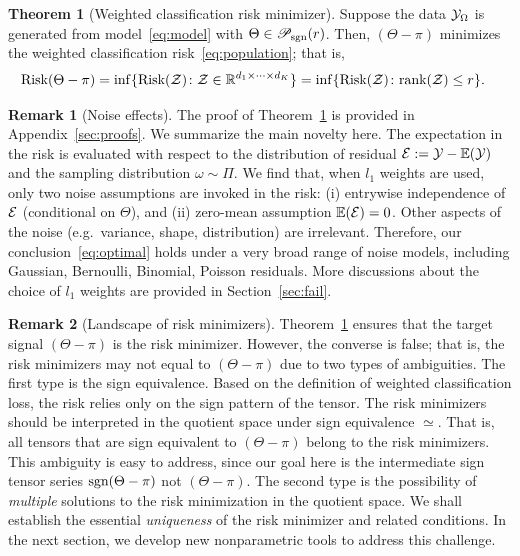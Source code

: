 \documentclass[twoside,11pt]{article}
\theoremstyle{definition}
\newtheorem{thm}{Theorem}
\newtheorem{rmk}{Remark}
\def\sign{\textup{sgn}}
\def\caliP{\mathscr{P}_{\textup{sgn}}}
\begin{document}
\begin{thm}[Weighted classification risk minimizer]\label{prop:global}
Suppose the data $\mathcal{Y}_\Omega$ is generated from model~\eqref{eq:model} with $\Theta \in \caliP(r)$. Then, $(\Theta-\pi)$ minimizes the weighted classification risk~\eqref{eq:population}; that is,
\begin{align}\label{eq:optimal}
\textup{Risk}(\Theta -\pi)&=\inf\{\textup{Risk}(\mathcal{Z})\colon \mathcal{Z}\in\mathbb{R}^{d_1\times \cdots \times d_K}\}
=\inf\{\textup{Risk}(\mathcal{Z})\colon \textup{rank} (\mathcal{Z})\leq r\}.
\end{align}
\end{thm}
\begin{rmk}[Noise effects]
The proof of Theorem~\ref{prop:global} is provided in Appendix~\ref{sec:proofs}. We summarize the main novelty here. The expectation in the risk is evaluated with respect to the distribution of residual $\mathcal{E}:=\mathcal{Y}-\mathbb{E}(\mathcal{Y})$ and the sampling distribution $\omega\sim \Pi$. We find that, when $l_1$ weights are used, only two noise assumptions are invoked in the risk: (i) entrywise independence of $\mathcal{E}$ (conditional on $\Theta$), and (ii) zero-mean assumption $\mathbb{E}(\mathcal{E})=0$. Other aspects of the noise (e.g.\ variance, shape, distribution) are irrelevant. Therefore, our conclusion~\eqref{eq:optimal} holds under a very broad range of noise models, including Gaussian, Bernoulli, Binomial, Poisson residuals. More discussions about the choice of $l_1$ weights are provided in Section~\ref{sec:fail}.
\end{rmk}

\begin{rmk}[Landscape of risk minimizers]\label{rmk:landscape}Theorem~\ref{prop:global} ensures that the target signal $(\Theta-\pi)$ is the risk minimizer. However, the converse is false; that is, the risk minimizers may not equal to $(\Theta-\pi)$ due to two types of ambiguities. The first type is the sign equivalence. Based on the definition of weighted classification loss, the risk relies only on the sign pattern of the tensor. The risk minimizers should be interpreted in the quotient space under sign equivalence $\simeq$. That is, all tensors that are sign equivalent to $(\Theta-\pi)$ belong to the risk minimizers. This ambiguity is easy to address, since our goal here is the intermediate sign tensor series $\sign(\Theta-\pi)$ not $(\Theta-\pi)$. The second type is the possibility of \emph{multiple} solutions to the risk minimization in the quotient space. We shall establish the essential \emph{uniqueness} of the risk minimizer and related conditions. In the next section, we develop new nonparametric tools to address this challenge. 
\end{rmk}
\end{document}
